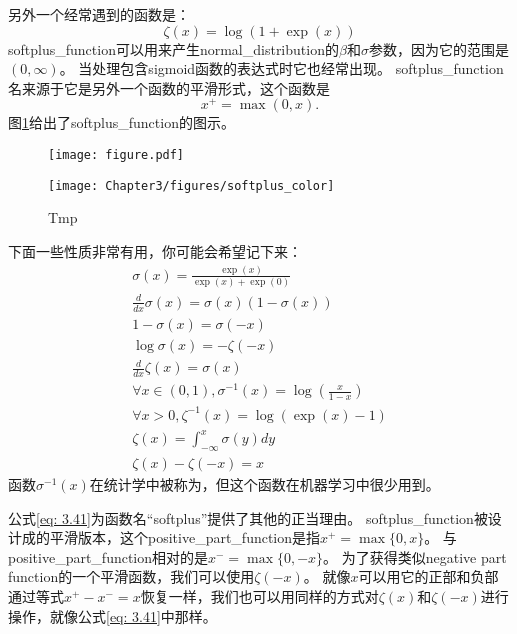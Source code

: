另外一个经常遇到的函数是\citep{secondorder:2001:nips}：
\begin{equation}
\zeta(x) = \log(1+\exp(x))
\end{equation}
\gls{softplus_function}可以用来产生\gls{normal_distribution}的$\beta$和$\sigma$参数，因为它的范围是$(0,\infty)$。
当处理包含sigmoid函数的表达式时它也经常出现。
\gls{softplus_function}名来源于它是另外一个函数的平滑形式，这个函数是
\begin{equation}
x^+ = \max(0, x).
\end{equation}
图\ref{fig:chap3_softplus_color}给出了\gls{softplus_function}的图示。
\begin{figure}[!htb]
\ifOpenSource
\centerline{\texttt{[image: figure.pdf]}}
\else
\centerline{\texttt{[image: Chapter3/figures/softplus\_color]}}
\fi
\caption{Tmp}
\label{fig:chap3_softplus_color}
\end{figure}



下面一些性质非常有用，你可能会希望记下来：
\begin{gather}
\sigma(x) = \frac{\exp(x)}{\exp(x)+\exp(0)}\\
\frac{d}{dx} \sigma(x) = \sigma(x)(1 - \sigma(x))\\
1-\sigma(x) = \sigma(-x)\\
\log \sigma(x) = -\zeta(-x)\\
\frac{d}{dx} \zeta(x) = \sigma(x)\\
\forall x \in (0, 1), \sigma^{-1}(x) = \log \left (  \frac{x}{1-x} \right)\\
\forall x>0, \zeta^{-1}(x) = \log(\exp(x) - 1)\\
\zeta(x) = \int_{-\infty}^x \sigma(y) dy\\
\zeta(x) - \zeta(-x) = x
\label{eq: 3.41}
\end{gather}
函数$\sigma^{-1}(x)$在统计学中被称为，但这个函数在机器学习中很少用到。


公式\ref{eq: 3.41}为函数名``softplus''提供了其他的正当理由。
\gls{softplus_function}被设计成的平滑版本，这个\gls{positive_part_function}是指$x^+ = \max \{ 0, x\}$。
与\gls{positive_part_function}相对的是$x^- = \max\{ 0, -x\}$。
为了获得类似\gls{negative part function}的一个平滑函数，我们可以使用$\zeta(-x)$。
就像$x$可以用它的正部和负部通过等式$x^+ - x^- = x$恢复一样，我们也可以用同样的方式对$\zeta(x)$和$\zeta(-x)$进行操作，就像公式\ref{eq: 3.41}中那样。

